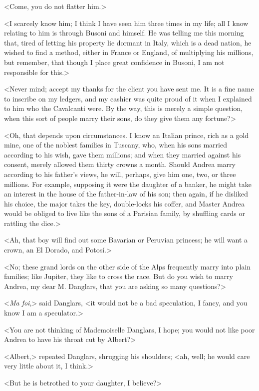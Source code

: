 <Come, you do not flatter him.> 

 <I scarcely know him; I think I have seen him three times in my life; all I know relating to him is through Busoni and himself. He was telling me this morning that, tired of letting his property lie dormant in Italy, which is a dead nation, he wished to find a method, either in France or England, of multiplying his millions, but remember, that though I place great confidence in Busoni, I am not responsible for this.> 

 <Never mind; accept my thanks for the client you have sent me. It is a fine name to inscribe on my ledgers, and my cashier was quite proud of it when I explained to him who the Cavalcanti were. By the way, this is merely a simple question, when this sort of people marry their sons, do they give them any fortune?> 

 <Oh, that depends upon circumstances. I know an Italian prince, rich as a gold mine, one of the noblest families in Tuscany, who, when his sons married according to his wish, gave them millions; and when they married against his consent, merely allowed them thirty crowns a month. Should Andrea marry according to his father's views, he will, perhaps, give him one, two, or three millions. For example, supposing it were the daughter of a banker, he might take an interest in the house of the father-in-law of his son; then again, if he disliked his choice, the major takes the key, double-locks his coffer, and Master Andrea would be obliged to live like the sons of a Parisian family, by shuffling cards or rattling the dice.> 

 <Ah, that boy will find out some Bavarian or Peruvian princess; he will want a crown, an El Dorado, and Potosí.> 

 <No; these grand lords on the other side of the Alps frequently marry into plain families; like Jupiter, they like to cross the race. But do you wish to marry Andrea, my dear M. Danglars, that you are asking so many questions?> 

 <\textit{Ma foi},> said Danglars, <it would not be a bad speculation, I fancy, and you know I am a speculator.> 

 <You are not thinking of Mademoiselle Danglars, I hope; you would not like poor Andrea to have his throat cut by Albert?> 

 <Albert,> repeated Danglars, shrugging his shoulders; <ah, well; he would care very little about it, I think.> 

 <But he is betrothed to your daughter, I believe?> 

